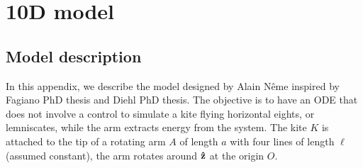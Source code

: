 
\section{10D model} \label{sec:model10D}
\subsection{Model description}
In this appendix, we describe the model designed by Alain Nême inspired by Fagiano PhD thesis and Diehl PhD thesis. 
The objective is to have an ODE that does not involve a control to simulate a kite flying horizontal eights, or lemniscates, while the arm extracts energy from the system.
The kite $K$ is attached to the tip of a rotating arm $A$ of length $a$ with four lines of length $\ell$ (assumed constant), the arm rotates around $\vu z$ at the origin $O$.

